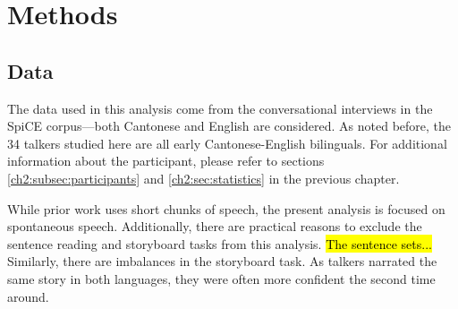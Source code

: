 \section{Methods}\label{ch3:sec:methods}
\subsection{Data}\label{ch3:sec:data}
The data used in this analysis come from the conversational interviews in the SpiCE corpus---both Cantonese and English are considered. As noted before, the 34 talkers studied here are all early Cantonese-English bilinguals. For additional information about the participant, please refer to sections \ref{ch2:subsec:participants} and \ref{ch2:sec:statistics} in the previous chapter. 

While prior work uses short chunks of speech, the present analysis is focused on spontaneous speech. Additionally, there are practical reasons to exclude the sentence reading and storyboard tasks from this analysis. \hl{The sentence sets...} Similarly, there are imbalances in the storyboard task. As talkers narrated the same story in both languages, they were often more confident the second time around. 



